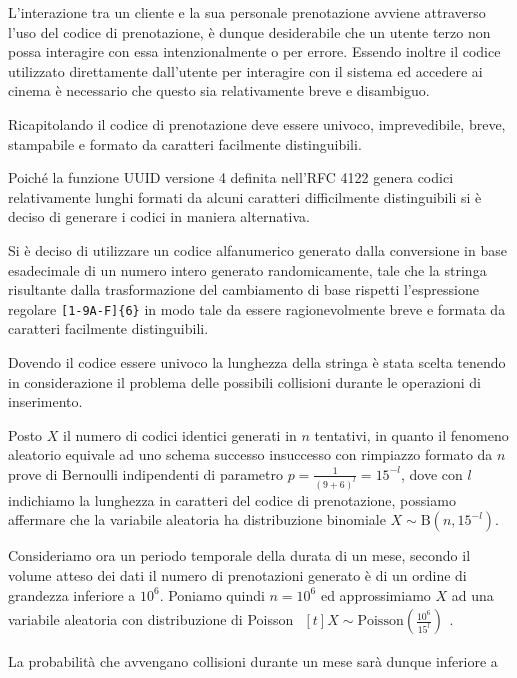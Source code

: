 L'interazione tra un cliente e la sua personale prenotazione avviene attraverso
l'uso del codice di prenotazione, è dunque desiderabile che un utente terzo non
possa interagire con essa intenzionalmente o per errore. Essendo inoltre
il codice utilizzato direttamente dall'utente per interagire con il sistema
ed accedere ai cinema è necessario che questo sia relativamente breve e
disambiguo.

Ricapitolando il codice di prenotazione deve essere univoco, imprevedibile,
breve, stampabile e formato da caratteri facilmente distinguibili.

Poiché la funzione UUID versione 4 definita nell'RFC 4122 genera codici
relativamente lunghi formati da alcuni caratteri difficilmente distinguibili
si è deciso di generare i codici in maniera alternativa.

Si è deciso di utilizzare un codice alfanumerico generato dalla conversione in
base esadecimale di un numero intero generato randomicamente, tale che
la stringa risultante dalla trasformazione del cambiamento di base rispetti
l'espressione regolare \verb|[1-9A-F]{6}| in modo tale da essere ragionevolmente
breve e formata da caratteri facilmente distinguibili.

Dovendo il codice essere univoco la lunghezza della stringa è stata scelta
tenendo in considerazione il problema delle possibili collisioni durante le
operazioni di inserimento.

Posto $X$ il numero di codici identici generati in $n$ tentativi, in quanto
il fenomeno aleatorio equivale ad uno schema successo insuccesso con rimpiazzo
formato da $n$ prove di Bernoulli indipendenti di parametro
$p = \frac{1}{\left( 9 + 6 \right)^l} = 15^{-l}$,
dove con $l$ indichiamo la lunghezza in caratteri del codice di prenotazione,
possiamo affermare che la variabile aleatoria ha distribuzione binomiale
$X \sim \mathrm{B}\left( n, 15^{-l} \right)$.

Consideriamo ora un periodo temporale della durata di un mese, secondo il volume
atteso dei dati il numero di prenotazioni generato è di un ordine di grandezza
inferiore a $10^6$. Poniamo quindi $n = 10^6$ ed approssimiamo $X$ ad una
variabile aleatoria con distribuzione di Poisson
$\begin{aligned}[t]
        X \sim \mathrm{Poisson}\left( \frac{10^6}{15^l} \right)
    \end{aligned}$.

La probabilità che avvengano collisioni durante un mese sarà dunque inferiore a

